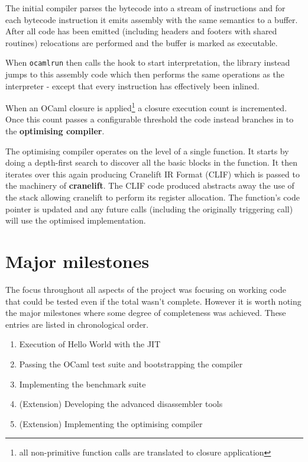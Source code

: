 The initial compiler parses the bytecode into a stream of instructions and for each bytecode
instruction
it emits assembly with the same semantics to a buffer. After all code has been emitted (including
headers
and footers with shared routines) relocations are performed and the buffer is marked as executable.

When \texttt{ocamlrun} then calls the hook to start interpretation, the library instead jumps to
this assembly code which then performs the same operations as the interpreter - except that every
instruction has effectively been inlined.

When an OCaml closure is applied\footnote{all non-primitive function calls are translated to
      closure application}
a closure execution count is incremented. Once this count passes a configurable threshold the code
instead
branches in to the \textbf{optimising compiler}.

The optimising compiler operates on the level of a single function. It starts by doing a
depth-first search to discover all the basic blocks in the function. It then iterates over this
again producing Cranelift IR Format (CLIF) which is passed to the machinery of
\textbf{cranelift}. The CLIF code produced abstracts away the use of the stack allowing cranelift
to perform its register allocation. The function's code pointer is updated and any future calls
(including the originally triggering call) will use the optimised implementation.

\section{Major milestones}

The focus throughout all aspects of the project was focusing on working code that could be tested
even if the total wasn't complete. However it is worth noting the major milestones where some
degree of completeness was achieved. These entries are listed in chronological order.

\begin{enumerate}
      \item Execution of Hello World with the JIT
      \item Passing the OCaml test suite and bootstrapping the compiler
      \item Implementing the benchmark suite
      \item (Extension) Developing the advanced disassembler tools
      \item (Extension) Implementing the optimising compiler
\end{enumerate}

